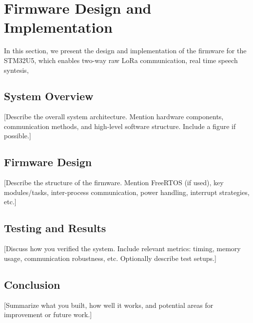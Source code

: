 \section{Firmware Design and Implementation}

In this section, we present the design and implementation of the firmware for the STM32U5, which enables two-way raw LoRa communication, real time speech syntesis, %

\subsection{System Overview}
[Describe the overall system architecture. Mention hardware components, communication methods, and high-level software structure. Include a figure if possible.]


\subsection{Firmware Design}
[Describe the structure of the firmware. Mention FreeRTOS (if used), key modules/tasks, inter-process communication, power handling, interrupt strategies, etc.]

\subsection{Testing and Results}
[Discuss how you verified the system. Include relevant metrics: timing, memory usage, communication robustness, etc. Optionally describe test setups.]

\subsection{Conclusion}
[Summarize what you built, how well it works, and potential areas for improvement or future work.]
